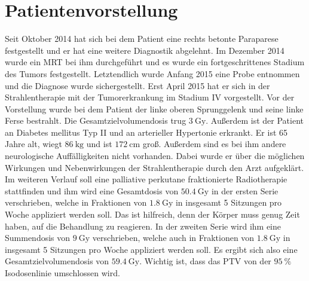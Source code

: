 \section{Patientenvorstellung}
Seit Oktober 2014 hat sich bei dem Patient eine rechts betonte Paraparese festgestellt und er hat eine weitere Diagnostik abgelehnt. Im Dezember 2014 wurde ein MRT bei ihm durchgeführt und es wurde ein fortgeschrittenes Stadium des Tumors festgestellt. Letztendlich wurde Anfang 2015 eine Probe entnommen und die Diagnose wurde sichergestellt. Erst April 2015 hat er sich in der Strahlentherapie mit der Tumorerkrankung im Stadium IV vorgestellt. Vor der Vorstellung wurde bei dem Patient der linke oberen Sprunggelenk und seine linke Ferse bestrahlt. Die Gesamtzielvolumendosis trug $\SI{3}{\gray}$. Außerdem ist der Patient an Diabetes mellitus Typ II und an arterieller Hypertonie erkrankt. Er ist 65 Jahre alt, wiegt $\SI{86}{\kilogram}$ und ist $\SI{172}{\centi\meter}$ groß. Außerdem sind es bei ihm andere neurologische Auffälligkeiten nicht vorhanden. Dabei wurde er über die möglichen Wirkungen und Nebenwirkungen der Strahlentherapie durch den Arzt aufgeklärt. Im weiteren Verlauf soll eine palliative perkutane fraktionierte Radiotherapie stattfinden und ihm wird eine Gesamtdosis von $\SI{50,4}{\gray}$ in der ersten Serie verschrieben, welche in Fraktionen von $\SI{1,8}{\gray}$ in insgesamt 5 Sitzungen pro Woche appliziert werden soll. Das ist hilfreich, denn der Körper muss genug Zeit haben, auf die Behandlung zu reagieren. In der zweiten Serie wird ihm eine Summendosis von $\SI{9}{\gray}$ verschrieben, welche auch in Fraktionen von $\SI{1,8}{\gray}$ in insgesamt 5 Sitzungen pro Woche appliziert werden soll. Es ergibt sich also eine Gesamtzielvolumendosis von  $\SI{59,4}{\gray}$. Wichtig ist, dass das PTV von der $\SI{95}{\percent}$ Isodosenlinie umschlossen wird. 